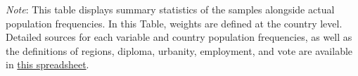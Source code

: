 \begin{table}[h]
    \cprotect\caption[Sample representativeness of each European country]{Sample representativeness for each European country. %
    } \label{tab:representativeness_EU}
    \makebox[\textwidth][c]{
        \resizebox*{!}{.50\textheight}{%
        
        }
    }
    {\footnotesize \textit{Note}: This table displays summary statistics of the samples alongside actual population frequencies. In this Table, weights are defined at the country level.  %
    Detailed sources for each variable and country population frequencies, as well as the definitions of regions, diploma, urbanity, employment, and vote are available in \href{https://github.com/bixiou/international_attitudes_toward_global_policies/raw/main/questionnaire/specificities.xlsx}{this spreadsheet}. %
    }
\end{table}

